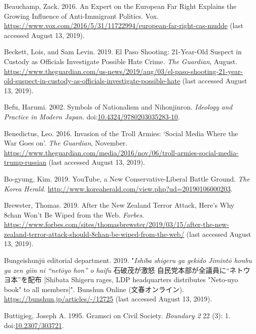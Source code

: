 \documentclass[10pt,british,A4paper,twoside]{memoir}
\begin{document}
\hypertarget{ref-beauchamp_expert_2016}{}
Beauchamp, Zack. 2016. An Expert on the European Far Right Explains the
Growing Influence of Anti-Immigrant Politics. Vox.
\url{https://www.vox.com/2016/5/31/11722994/european-far-right-cas-mudde} (last accessed August 13, 2019).

\hypertarget{ref-beckett_paso_2019}{}
Beckett, Lois, and Sam Levin. 2019. El Paso Shooting: 21-Year-Old
Suspect in Custody as Officials Investigate Possible Hate Crime.
\emph{The Guardian}, August.
\url{https://www.theguardian.com/us-news/2019/aug/03/el-paso-shooting-21-year-old-suspect-in-custody-as-officials-investigate-possible-hate} (last accessed August 13, 2019).

\hypertarget{ref-befu_symbols_2002}{}
Befu, Harumi. 2002. Symbols of Nationalism and Nihonjinron.
\emph{Ideology and Practice in Modern Japan}.
doi:\href{https://doi.org/10.4324/9780203035283-10}{10.4324/9780203035283-10}.

\hypertarget{ref-benedictus_invasion_2016}{}
Benedictus, Leo. 2016. Invasion of the Troll Armies: `Social Media Where
the War Goes on'. \emph{The Guardian}, November.
\url{https://www.theguardian.com/media/2016/nov/06/troll-armies-social-media-trump-russian} (last accessed August 13, 2019).

\hypertarget{ref-bo-gyung_youtube_2019}{}
Bo-gyung, Kim. 2019. YouTube, a New Conservative-Liberal Battle Ground.
\emph{The Korea Herald}.
\url{http://www.koreaherald.com/view.php?ud=20190106000203}.

\hypertarget{ref-brewster_after_2019}{}
Brewster, Thomas. 2019. After the New Zealand Terror Attack, Here's Why
8chan Won't Be Wiped from the Web. \emph{Forbes}.
\url{https://www.forbes.com/sites/thomasbrewster/2019/03/15/after-the-new-zealand-terror-attack-should-8chan-be-wiped-from-the-web/} (last accessed August 13, 2019).

\hypertarget{ref-bungeishunju_editorial_department_eng._2019}{}
Bungeishunjū editorial department. 2019. "\emph{Ishiba shigeru ga gekido Jimintō honbu ga zen giin ni “netōyo hon” o haifu} 石破茂が激怒 自民党本部が全議員に“ネトウヨ本”を配布 [Shibata Shigeru rages, LDP headquarters distributes "Neto-uyo book" to all members]". 
Bunshun Online (文春オンライン). \url{https://bunshun.jp/articles/-/12725} (last accessed August 13, 2019).

\hypertarget{ref-buttigieg_gramsci_1995}{}
Buttigieg, Joseph A. 1995. Gramsci on Civil Society. \emph{Boundary 2}
22 (3): 1. doi:\href{https://doi.org/10.2307/303721}{10.2307/303721}.
\end{document}
